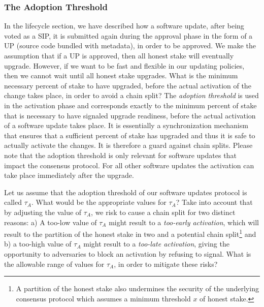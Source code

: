 \subsubsection{The Adoption Threshold}
In the lifecycle section, we have described how a software update, after being voted as a SIP, it is submitted again during the approval phase in the form of a UP (source code bundled with metadata), in order to be approved. We make the assumption that if a UP is approved, then all honest stake will eventually upgrade. However, if we want to be fast and flexible in our updating policies, then we cannot wait until all honest stake upgrades. What is the minimum necessary percent of stake to have upgraded, before the actual activation of the change takes place, in order to avoid a chain split? The \emph{adoption threshold} is used in the activation phase and corresponds exactly to the minimum percent of stake that is necessary to have signaled upgrade readiness, before the actual activation of a software update takes place. It is essentially a synchronization mechanism that ensures that a sufficient percent of stake has upgraded and thus it is safe to actually activate the changes. It is therefore a guard against chain splits. Please note that the adoption threshold is only relevant for software updates that impact the consensus protocol. For all other software updates the activation can take place immediately after the upgrade.

Let us assume that the adoption threshold of our software updates protocol is called $\tau_A$. %
What would be the appropriate values for $\tau_A$? Take into account that by adjusting the value of $\tau_A$, we risk to cause a chain split for two distinct reasons: a) A too-low value of $\tau_A$ might result to a \emph{too-early activation}, which will result to the partition of the honest stake in two and a potential chain split\footnote{A partition of the honest stake also undermines the security of the underlying consensus protocol which assumes a minimum threshold $x$ of honest stake.}  and b) a too-high value of $\tau_A$ might result to a \emph{too-late activation}, giving the opportunity to adversaries to block an activation by refusing to signal. %
What is the allowable range of values for $\tau_A$, in order to mitigate these risks?

